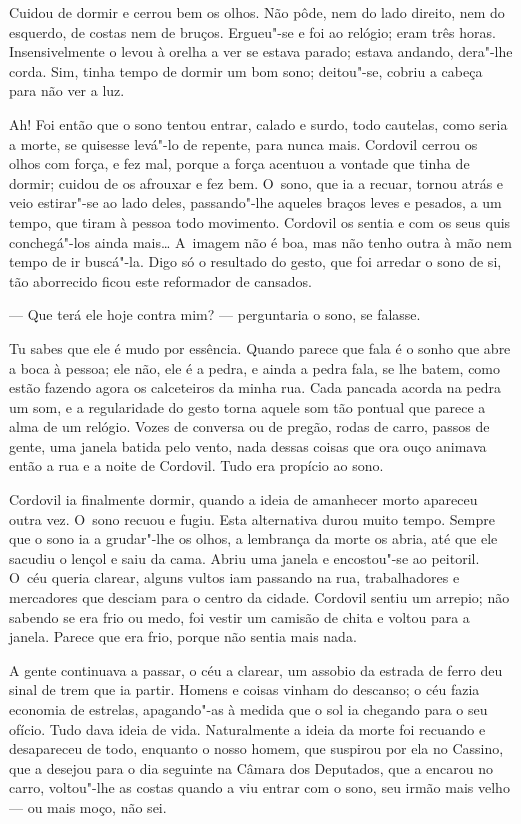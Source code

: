 \begin{linenumbers}
Cuidou de dormir e cerrou bem os olhos. Não pôde, nem do lado direito,
nem do esquerdo, de costas nem de bruços. Ergueu"-se e foi ao relógio;
eram três horas. Insensivelmente o levou à orelha a ver se estava
parado; estava andando, dera"-lhe corda. Sim, tinha tempo de dormir um
bom sono; deitou"-se, cobriu a cabeça para não ver a luz.

Ah! Foi então que o sono tentou entrar, calado e surdo, todo cautelas,
como seria a morte, se quisesse levá"-lo de repente, para nunca mais.
Cordovil cerrou os olhos com força, e fez mal, porque a força acentuou a
vontade que tinha de dormir; cuidou de os afrouxar e fez bem. O~sono,
que ia a recuar, tornou atrás e veio estirar"-se ao lado deles,
passando"-lhe aqueles braços leves e pesados, a um tempo, que tiram à
pessoa todo movimento. Cordovil os sentia e com os seus quis
conchegá"-los ainda mais\ldots{} A~imagem não é boa, mas não tenho outra à mão
nem tempo de ir buscá"-la. Digo só o resultado do gesto, que foi arredar
o sono de si, tão aborrecido ficou este reformador de cansados.

--- Que terá ele hoje contra mim? --- perguntaria o sono, se falasse.

Tu sabes que ele é mudo por essência. Quando parece que fala é o sonho
que abre a boca à pessoa; ele não, ele é a pedra, e ainda a pedra fala,
se lhe batem, como estão fazendo agora os calceteiros da minha rua. Cada
pancada acorda na pedra um som, e a regularidade do gesto torna aquele
som tão pontual que parece a alma de um relógio. Vozes de conversa ou de
pregão, rodas de carro, passos de gente, uma janela batida pelo vento,
nada dessas coisas que ora ouço animava então a rua e a noite de
Cordovil. Tudo era propício ao sono.

Cordovil ia finalmente dormir, quando a ideia de amanhecer morto
apareceu outra vez. O~sono recuou e fugiu. Esta alternativa durou muito
tempo. Sempre que o sono ia a grudar"-lhe os olhos, a lembrança da morte
os abria, até que ele sacudiu o lençol e saiu da cama. Abriu uma janela
e encostou"-se ao peitoril. O~céu queria clarear, alguns vultos iam
passando na rua, trabalhadores e mercadores que desciam para o centro da
cidade. Cordovil sentiu um arrepio; não sabendo se era frio ou medo, foi
vestir um camisão de chita e voltou para a janela. Parece que era frio,
porque não sentia mais nada.

A gente continuava a passar, o céu a clarear, um assobio da estrada de
ferro deu sinal de trem que ia partir. Homens e coisas vinham do
descanso; o céu fazia economia de estrelas, apagando"-as à medida que o
sol ia chegando para o seu ofício. Tudo dava ideia de vida. Naturalmente
a ideia da morte foi recuando e desapareceu de todo, enquanto o nosso
homem, que suspirou por ela no Cassino, que a desejou para o dia
seguinte na Câmara dos Deputados, que a encarou no carro, voltou"-lhe as
costas quando a viu entrar com o sono, seu irmão mais velho --- ou mais
moço, não sei.


\end{linenumbers}
